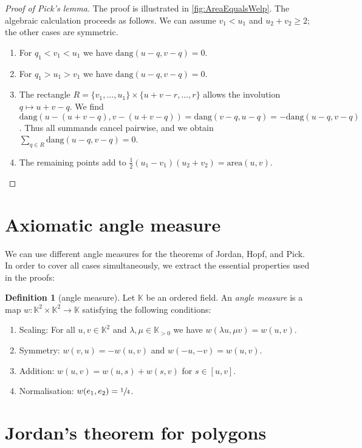 \documentclass[a4paper]{amsart}
\numberwithin{equation}{section}
\theoremstyle{plain}
\theoremstyle{definition}
\newtheorem{definition}[theorem]{Definition}
\newcommand{\K}{\mathbb{K}}
\newcommand{\area}{\mathrm{area}}
\newcommand{\dang}{\mathrm{dang}}
\begin{document}
\begin{proof}[Proof of Pick's lemma]
  The proof is illustrated in \autoref{fig:AreaEqualsWelp}.
  The algebraic calculation proceeds as follows.
  We can assume $v_1 < u_1$ and $u_2 + v_2 \ge 2$;
  the other cases are symmetric.
  \begin{enumerate}
  \item
    For $q_1 < v_1 < u_1$ we have $\dang(u-q,v-q) = 0$.
  \item
    For $q_1 > u_1 > v_1$ we have $\dang(u-q,v-q) = 0$.
  \item
    The rectangle $R = \{v_1,\ldots,u_1\} \times \{u+v-r,\ldots,r\}$
    allows the involution $q \mapsto u+v-q$.
    We find $\dang(u-(u+v-q), v-(u+v-q)) = \dang(v-q,u-q) = -\dang(u-q,v-q)$.
    Thus all summands cancel pairwise,
    and we obtain $\sum_{q \in R} \dang(u-q,v-q) = 0$.
  \item
    The remaining points add to $\frac{1}{2} (u_1-v_1) (u_2+v_2) = \area(u,v)$.
  \end{enumerate}

\end{proof}

\appendix

\section{Axiomatic angle measure}

We can use different angle measures for the theorems of Jordan, Hopf, and Pick.
In order to cover all cases simultaneously, 
we extract the essential properties used in the proofs:

\begin{definition}[angle measure\label{def:AngleMeasure}]
  Let $\K$ be an ordered field.
  An \emph{angle measure} is a map $w \colon \K^2 \times \K^2 \to \K$
  satisfying the following conditions:
  \begin{enumerate}
  \item
    Scaling: For all $u,v \in \K^2$ and $\lambda, \mu \in \K_{>0}$
    we have $w(\lambda u, \mu v) = w(u,v)$.
  \item
    Symmetry: $w(v,u) = -w(u,v)$ and $w(-u,-v) = w(u,v)$.
  \item
    Addition: $w(u,v) = w(u,s) + w(s,v)$ for $s \in [u,v]$.
  \item
    Normalisation: $w(e_1,e_2) = \sfrac{1}{4}$.
  \end{enumerate}
\end{definition}

\section{Jordan's theorem for polygons}
\end{document}
